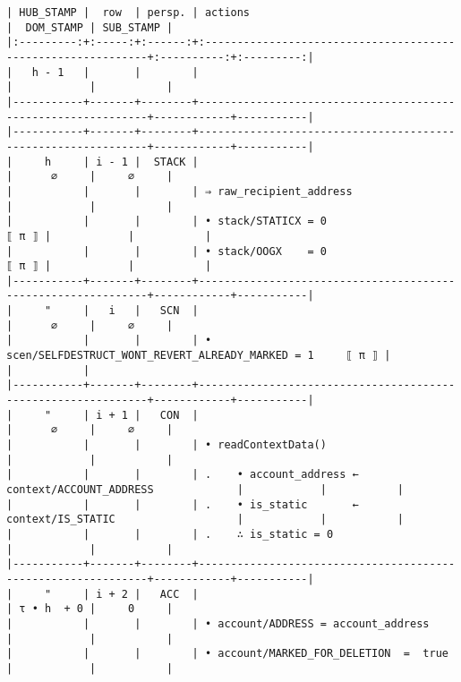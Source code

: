 \documentclass[varwidth=\maxdimen,margin=0.5cm,multi={verbatim}]{standalone}
\begin{document}
\begin{verbatim}
| HUB_STAMP |  row  | persp. | actions                                                      |  DOM_STAMP | SUB_STAMP |
|:---------:+:-----:+:------:+:-------------------------------------------------------------+:----------:+:---------:|
|   h - 1   |       |        |                                                              |            |           |
|-----------+-------+--------+--------------------------------------------------------------+------------+-----------|
|-----------+-------+--------+--------------------------------------------------------------+------------+-----------|
|     h     | i - 1 |  STACK |                                                              |      ∅     |     ∅     |
|           |       |        | ⇒ raw_recipient_address                                      |            |           |
|           |       |        | • stack/STATICX = 0                                    ⟦ π ⟧ |            |           |
|           |       |        | • stack/OOGX    = 0                                    ⟦ π ⟧ |            |           |
|-----------+-------+--------+--------------------------------------------------------------+------------+-----------|
|     "     |   i   |   SCN  |                                                              |      ∅     |     ∅     |
|           |       |        | • scen/SELFDESTRUCT_WONT_REVERT_ALREADY_MARKED = 1     ⟦ π ⟧ |            |           |
|-----------+-------+--------+--------------------------------------------------------------+------------+-----------|
|     "     | i + 1 |   CON  |                                                              |      ∅     |     ∅     |
|           |       |        | • readContextData()                                          |            |           |
|           |       |        | .    • account_address ← context/ACCOUNT_ADDRESS             |            |           |
|           |       |        | .    • is_static       ← context/IS_STATIC                   |            |           |
|           |       |        | .    ∴ is_static = 0                                         |            |           |
|-----------+-------+--------+--------------------------------------------------------------+------------+-----------|
|     "     | i + 2 |   ACC  |                                                              | τ • h  + 0 |     0     |
|           |       |        | • account/ADDRESS = account_address                          |            |           |
|           |       |        | • account/MARKED_FOR_DELETION  =  true                       |            |           |

\end{verbatim}
\end{document}
